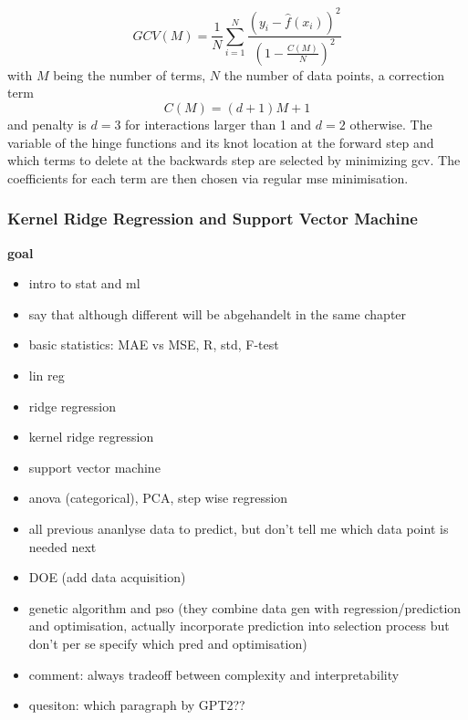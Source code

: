 \begin{equation}
    GCV(M) = \frac{1}{N} \sum_{i=1}^{N} \frac{ \left(y_i - \hat{f}(x_i) \right)^2 } {\left( 1- \frac{C(M)}{N}\right)^2 }
\end{equation}
with $M$ being the number of terms, $N$ the number of data points, a correction term
\begin{equation}
    C(M) = (d + 1)M + 1
\end{equation}
and penalty is $d=3$ for interactions larger than 1 and $d=2$ otherwise.
The variable of the hinge functions and its knot location at the forward step and which terms to delete 
at the backwards step are selected by minimizing \gls{gcv}. 
The coefficients for each term are then chosen via regular \gls{mse} minimisation\cite{friedman1988fitting}.


\iffalse
\subsubsection{Kernel Ridge Regression and Support Vector Machine}
\textbf{goal}
\begin{itemize}
    \item intro to stat and ml 
    \item say that although different will be abgehandelt in the same chapter 
    \item basic statistics: MAE vs MSE, R, std, F-test 
    \item lin reg 
    \item ridge regression 
    \item kernel ridge regression 
    \item support vector machine 
    \item anova (categorical), PCA, step wise regression
    \item all previous ananlyse data to predict, but don't tell me which data point is needed next 
    \item DOE (add data acquisition)
    \item genetic algorithm and pso (they combine data gen with regression/prediction and optimisation, actually incorporate prediction into selection process but don't per se specify which pred and optimisation)
    \item comment: always tradeoff between complexity and interpretability
    \item quesiton: which paragraph by GPT2?? 
\end{itemize}

